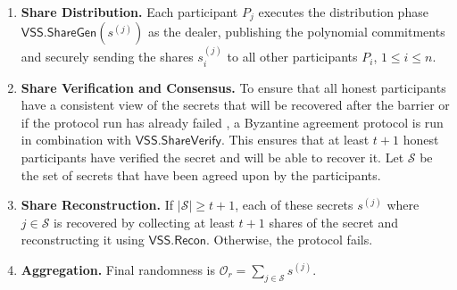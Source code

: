 \documentclass[letterpaper,twocolumn,10pt]{article}
\theoremstyle{definition}
\theoremstyle{remark}
\begin{document}
\begin{enumerate}
    \item \textbf{Share Distribution.} Each participant $P_j$ executes the distribution phase $\mathsf{VSS.ShareGen}(s^{(j)})$ as the dealer, publishing the polynomial commitments and securely sending the shares $s_i^{(j)}$ to all other participants $P_i$, $1\le i\le n$.
    \item \textbf{Share Verification and Consensus.} To ensure that all honest participants have a consistent view of the secrets that will be recovered after the barrier or if the protocol run has already failed , a Byzantine agreement protocol is run in combination with $\mathsf{VSS.ShareVerify}$. This ensures that at least $t + 1$ honest participants have verified the secret and will be able to recover it. Let $\mathcal{S}$ be the set of secrets that have been agreed upon by the participants.
    \item \textbf{Share Reconstruction.} If $\lvert \mathcal{S} \rvert \ge t + 1$, each of these secrets $s^{(j)}$ where $j \in \mathcal{S}$ is recovered by collecting at least $t + 1$ shares of the secret and reconstructing it using $\mathsf{VSS.Recon}$. Otherwise, the protocol fails.
    \item \textbf{Aggregation.} Final randomness is $\mathcal{O}_r = \sum_{j \in \mathcal{S}} s^{(j)}$.
    
\end{enumerate}
\fi

\iffalse
\end{document}
